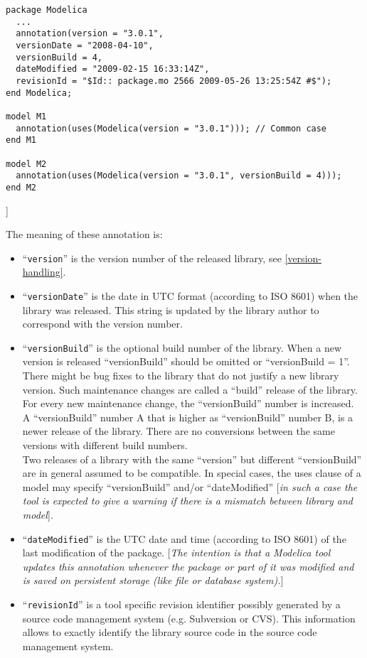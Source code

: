 \begin{lstlisting}[language=modelica]
package Modelica
  ...
  annotation(version = "3.0.1",
  versionDate = "2008-04-10",
  versionBuild = 4,
  dateModified = "2009-02-15 16:33:14Z",
  revisionId = "$Id:: package.mo 2566 2009-05-26 13:25:54Z #$");
end Modelica;

model M1
  annotation(uses(Modelica(version = "3.0.1"))); // Common case
end M1

model M2
  annotation(uses(Modelica(version = "3.0.1", versionBuild = 4)));
end M2
\end{lstlisting}
{]}

The meaning of these annotation is:

\begin{itemize}
\item
  ``\lstinline!version!'' is the version number of the released library,
  see \autoref{version-handling}.
\item
  ``\lstinline!versionDate!'' is the date in UTC format (according to ISO
  8601) when the library was released. This string is updated by the
  library author to correspond with the version number.
\item
  ``\lstinline!versionBuild!'' is the optional build number of the library.
  When a new version is released ``versionBuild'' should be omitted or
  ``versionBuild = 1''. There might be bug fixes to the library that do
  not justify a new library version. Such maintenance changes are called
  a ``build'' release of the library. For every new maintenance change,
  the ``versionBuild'' number is increased. A ``versionBuild'' number A
  that is higher as ``versionBuild'' number B, is a newer release of the
  library. There are no conversions between the same versions with
  different build numbers. \emph{\\
  }Two releases of a library with the same ``version'' but different
  ``versionBuild'' are in general assumed to be compatible. In special
  cases, the uses clause of a model may specify ``versionBuild'' and/or
  ``dateModified'' {[}\emph{in such a case the tool is expected to give
  a warning if there is a mismatch between library and model}{]}\emph{.}
\item
  ``\lstinline!dateModified!'' is the UTC date and time (according to ISO
  8601) of the last modification of the package. {[}\emph{The intention
  is that a Modelica tool updates this annotation whenever the package
  or part of it was modified and is saved on persistent storage (like
  file or database system).}{]}
\item
  ``\lstinline!revisionId!'' is a tool specific revision identifier
  possibly generated by a source code management system (e.g. Subversion
  or CVS). This information allows to exactly identify the library
  source code in the source code management system.
\end{itemize}

